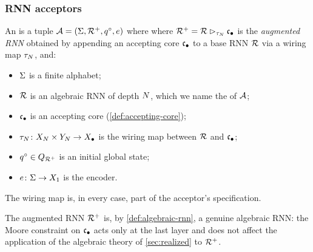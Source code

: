 \documentclass{article}
\begin{document}
\subsubsection{RNN acceptors}

\begin{definition}\label{def:rnn-acceptor}
An  is a tuple $\mathcal{A} = (\Sigma,{\mathcal{R}^{+}}, q^{\circ}, e)$ where where ${\mathcal{R}^{+}} = \mathcal{R} \mathbin{\rhd_{\tau_N}} {\mathfrak{c}_{\bullet}}$ is the \emph{augmented RNN} obtained by appending an accepting core ${\mathfrak{c}_{\bullet}}$ to a base RNN $\mathcal{R}$ via a wiring map $\tau_N$, and:
\begin{itemize}\itemsep 0em
\item $\Sigma$ is a finite alphabet;
\item $\mathcal{R}$ is an algebraic RNN of depth $N$, which we name the  of $\mathcal{A}$;
\item ${\mathfrak{c}_{\bullet}}$ is an accepting core (\cref{def:accepting-core});
\item $\tau_N \colon X_N \times Y_N \to X_\bullet$ is the wiring map between $\mathcal{R}$ and ${\mathfrak{c}_{\bullet}}$;
\item $q^{\circ} \in Q_{{\mathcal{R}^{+}}}$ is an initial global state;
\item $e \colon \Sigma \to X_1$ is the encoder.
\end{itemize}

The wiring map is, in every case, part of the acceptor's specification.
\end{definition}

\begin{remark}
The augmented RNN ${\mathcal{R}^{+}}$ is, by \cref{def:algebraic-rnn}, a genuine algebraic RNN: the Moore constraint on ${\mathfrak{c}_{\bullet}}$ acts only at the last layer and does not affect the application of the algebraic theory of \cref{sec:realized} to ${\mathcal{R}^{+}}$.
\end{remark}
\end{document}
